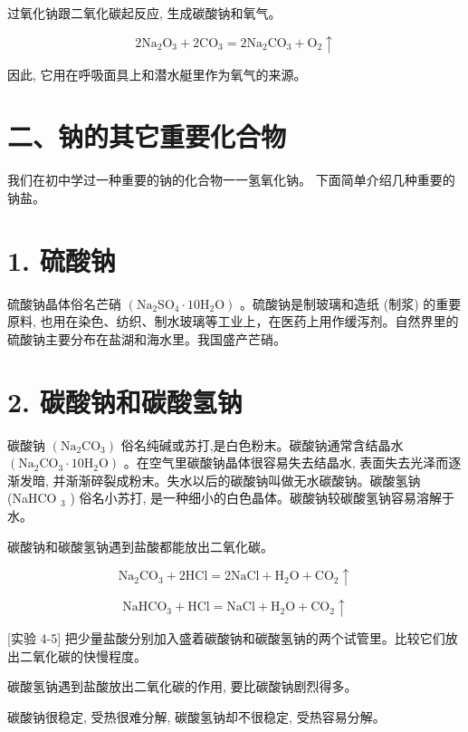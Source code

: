 \documentclass[10pt]{article}
\begin{document}
过氧化钠跟二氧化碳起反应, 生成碳酸钠和氧气。

\[
2{\mathrm{{Na}}}_{2}{\mathrm{O}}_{3} + 2{\mathrm{{CO}}}_{3} = 2{\mathrm{{Na}}}_{2}{\mathrm{{CO}}}_{3} + {\mathrm{O}}_{2} \uparrow
\]

因此, 它用在呼吸面具上和潜水艇里作为氧气的来源。

\section*{二、钠的其它重要化合物}

我们在初中学过一种重要的钠的化合物一一氢氧化钠。 下面简单介绍几种重要的钠盐。

\section*{1. 硫酸钠}

硫酸钠晶体俗名芒硝 \(\left( {{\mathrm{{Na}}}_{2}{\mathrm{{SO}}}_{4} \cdot {10}{\mathrm{H}}_{2}\mathrm{O}}\right)\) 。硫酸钠是制玻璃和造纸 (制浆) 的重要原料, 也用在染色、纺织、制水玻璃等工业上，在医药上用作缓泻剂。自然界里的硫酸钠主要分布在盐湖和海水里。我国盛产芒硝。

\section*{2. 碳酸钠和碳酸氢钠}

碳酸钠 \(\left( {{\mathrm{{Na}}}_{2}{\mathrm{{CO}}}_{3}}\right)\) 俗名纯碱或苏打,是白色粉末。碳酸钠通常含结晶水 \(\left( {{\mathrm{{Na}}}_{2}{\mathrm{{CO}}}_{3} \cdot {10}{\mathrm{H}}_{2}\mathrm{O}}\right)\) 。在空气里碳酸钠晶体很容易失去结晶水, 表面失去光泽而逐渐发暗, 并渐渐碎裂成粉末。失水以后的碳酸钠叫做无水碳酸钠。碳酸氢钠(NaHCO \({}_{3}\) ) 俗名小苏打, 是一种细小的白色晶体。碳酸钠较碳酸氢钠容易溶解于水。

碳酸钠和碳酸氢钠遇到盐酸都能放出二氧化碳。

\[
{\mathrm{{Na}}}_{2}{\mathrm{{CO}}}_{3} + 2\mathrm{{HCl}} = 2\mathrm{{NaCl}} + {\mathrm{H}}_{2}\mathrm{O} + {\mathrm{{CO}}}_{2} \uparrow
\]

\[
{\mathrm{{NaHCO}}}_{3} + \mathrm{{HCl}} = \mathrm{{NaCl}} + {\mathrm{H}}_{2}\mathrm{O} + {\mathrm{{CO}}}_{2} \uparrow
\]

[实验 4-5] 把少量盐酸分别加入盛着碳酸钠和碳酸氢钠的两个试管里。比较它们放出二氧化碳的快慢程度。

碳酸氢钠遇到盐酸放出二氧化碳的作用, 要比碳酸钠剧烈得多。

碳酸钠很稳定, 受热很难分解, 碳酸氢钠却不很稳定, 受热容易分解。
\end{document}
